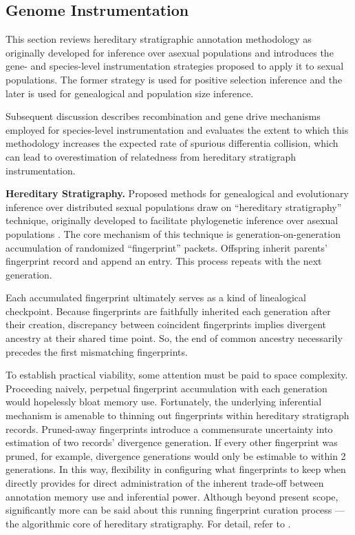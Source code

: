 \subsection{Genome Instrumentation}
\label{sec:genome-instrumentation}

This section reviews hereditary stratigraphic annotation methodology as originally developed for inference over asexual populations and introduces the gene- and species-level instrumentation strategies proposed to apply it to sexual populations.
The former strategy is used for positive selection inference and the later is used for genealogical and population size inference.

Subsequent discussion describes recombination and gene drive mechanisms employed for species-level instrumentation and evaluates the extent to which this methodology increases the expected rate of spurious differentia collision, which can lead to overestimation of relatedness from hereditary stratigraph instrumentation.


% 
% 
\textbf{Hereditary Stratigraphy.}
Proposed methods for genealogical and evolutionary inference over distributed sexual populations draw on ``hereditary stratigraphy'' technique, originally developed to facilitate phylogenetic inference over asexual populations \citep{moreno2022hstrat}.
The core mechanism of this technique is generation-on-generation accumulation of randomized ``fingerprint'' packets.
Offspring inherit parents' fingerprint record and append an entry.
This process repeats with the next generation.

Each accumulated fingerprint ultimately serves as a kind of linealogical checkpoint.
Because fingerprints are faithfully inherited each generation after their creation, discrepancy between coincident fingerprints implies divergent ancestry at their shared time point.
So, the end of common ancestry necessarily precedes the first mismatching fingerprints.

To establish practical viability, some attention must be paid to space complexity.
Proceeding naively, perpetual fingerprint accumulation with each generation would hopelessly bloat memory use.
Fortunately, the underlying inferential mechanism is amenable to thinning out fingerprints within hereditary stratigraph records.
Pruned-away fingerprints introduce a commensurate uncertainty into estimation of two records' divergence generation.
If every other fingerprint was pruned, for example, divergence generations would only be estimable to within 2 generations.
In this way, flexibility in configuring what fingerprints to keep when directly provides for direct administration of the inherent trade-off between annotation memory use and inferential power.
Although beyond present scope, significantly more can be said about this running fingerprint curation process --- the algorithmic core of hereditary stratigraphy.
For detail, refer to \citep{moreno2022hereditary}.

